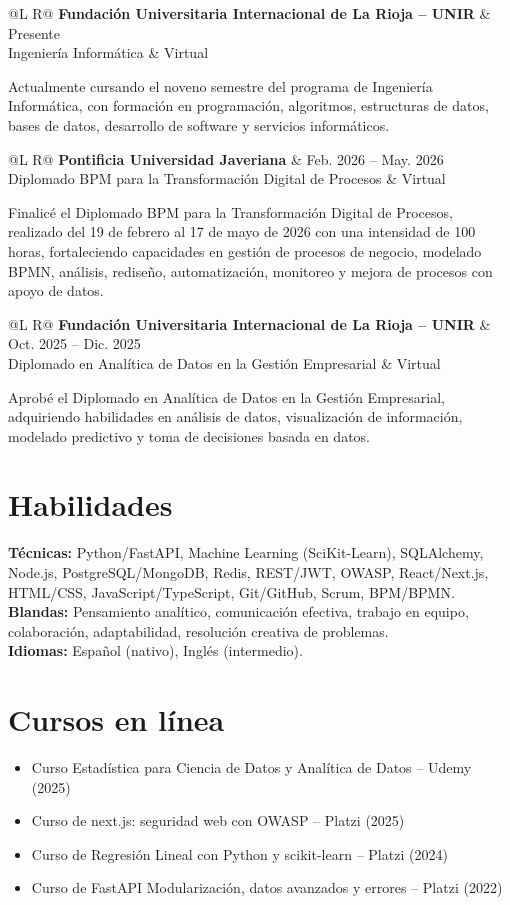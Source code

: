\documentclass[10pt,letterpaper]{article}
\makeatletter
\newcommand{\entry}[5]{
  \begin{tabularx}{\textwidth}{@{}L R@{}}
    \textbf{#1} & #3 \\
    #2 & #4 \\
  \end{tabularx}
  \vspace{0.12em}
  #5
  \vspace{0.32em}
}
\makeatother
\begin{document}
\entry
  {Fundación Universitaria Internacional de La Rioja -- UNIR}
  {Ingeniería Informática}
  {Presente}
  {Virtual}
  {Actualmente cursando el noveno semestre del programa de Ingeniería Informática, con formación en programación, algoritmos, estructuras de datos, bases de datos, desarrollo de software y servicios informáticos.}

\entry
  {Pontificia Universidad Javeriana}
  {Diplomado BPM para la Transformación Digital de Procesos}
  {Feb. 2026 -- May. 2026}
  {Virtual}
  {Finalicé el Diplomado BPM para la Transformación Digital de Procesos, realizado del 19 de febrero al 17 de mayo de 2026 con una intensidad de 100 horas, fortaleciendo capacidades en gestión de procesos de negocio, modelado BPMN, análisis, rediseño, automatización, monitoreo y mejora de procesos con apoyo de datos.}

\entry
  {Fundación Universitaria Internacional de La Rioja -- UNIR}
  {Diplomado en Analítica de Datos en la Gestión Empresarial}
  {Oct. 2025 -- Dic. 2025}
  {Virtual}
  {Aprobé el Diplomado en Analítica de Datos en la Gestión Empresarial, adquiriendo habilidades en análisis de datos, visualización de información, modelado predictivo y toma de decisiones basada en datos.}

\section*{Habilidades}

\textbf{Técnicas:} Python/FastAPI, Machine Learning (SciKit-Learn), SQLAlchemy, Node.js, PostgreSQL/MongoDB, Redis, REST/JWT, OWASP, React/Next.js, HTML/CSS, JavaScript/TypeScript, Git/GitHub, Scrum, BPM/BPMN.\\
\textbf{Blandas:} Pensamiento analítico, comunicación efectiva, trabajo en equipo, colaboración, adaptabilidad, resolución creativa de problemas.\\
\textbf{Idiomas:} Español (nativo), Inglés (intermedio).

\section*{Cursos en línea}

\begin{itemize}
  \item Curso Estadística para Ciencia de Datos y Analítica de Datos -- Udemy (2025)
  \item Curso de next.js: seguridad web con OWASP -- Platzi (2025)
  \item Curso de Regresión Lineal con Python y scikit-learn -- Platzi (2024)
  \item Curso de FastAPI Modularización, datos avanzados y errores -- Platzi (2022)
\end{itemize}
\end{document}
